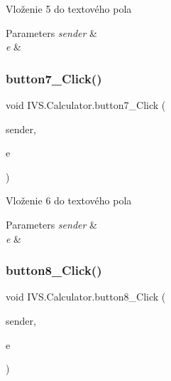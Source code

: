 Vloženie \textquotesingle{}5\textquotesingle{} do textového pola 


\begin{DoxyParams}{Parameters}
{\em sender} & \\
\hline
{\em e} & \\
\hline
\end{DoxyParams}
\mbox{\label{class_i_v_s_1_1_calculator_ab96b96bb1f464fa88084118d38bc9d9e}} 
\subsubsection{\texorpdfstring{button7\+\_\+\+Click()}{button7\_Click()}}
{\footnotesize\ttfamily void I\+V\+S.\+Calculator.\+button7\+\_\+\+Click (\begin{DoxyParamCaption}\item[{object}]{sender,  }\item[{Event\+Args}]{e }\end{DoxyParamCaption})\hspace{0.3cm}{\ttfamily [protected]}}



Vloženie \textquotesingle{}6\textquotesingle{} do textového pola 


\begin{DoxyParams}{Parameters}
{\em sender} & \\
\hline
{\em e} & \\
\hline
\end{DoxyParams}
\mbox{\label{class_i_v_s_1_1_calculator_a7de16fbeb3e7bea132d8540dde1cd110}} 
\subsubsection{\texorpdfstring{button8\+\_\+\+Click()}{button8\_Click()}}
{\footnotesize\ttfamily void I\+V\+S.\+Calculator.\+button8\+\_\+\+Click (\begin{DoxyParamCaption}\item[{object}]{sender,  }\item[{Event\+Args}]{e }\end{DoxyParamCaption})\hspace{0.3cm}{\ttfamily [protected]}}



